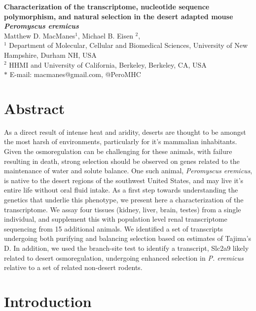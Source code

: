 \documentclass[11pt]{article}
\date{}
\newcommand{\peer}{\textit{P. eremicus}}
\begin{document}
\begin{flushleft}
{\Large
\textbf{Characterization of the transcriptome, nucleotide sequence polymorphism, and natural selection in the desert adapted mouse \textit{Peromyscus eremicus}}
}
\\
Matthew D. MacManes$^{1}$, 
Michael B. Eisen $^{2}$, 
\\
$^{1}$ Department of Molecular, Cellular and Biomedical Sciences, University of New Hampshire, Durham NH, USA
\\
$^{2}$ HHMI and University of California, Berkeley, Berkeley, CA, USA
\\
$\ast$ E-mail: macmanes@gmail.com, @PeroMHC
\end{flushleft}

\linenumbers

\section*{Abstract}

As a direct result of intense heat and aridity, deserts are thought to be amongst the most harsh of environments, particularly for it's mammalian inhabitants. Given the osmoregulation can be challenging for these animals, with failure resulting in death, strong selection should be observed on genes related to the maintenance of water and solute balance. One such animal, \textit{Peromyscus eremicus}, is native to the desert regions of the southwest United States, and may live it's entire life without oral fluid intake. As a first step towards understanding the genetics that underlie this phenotype, we present here a characterization of the transcriptome. We assay four tissues (kidney, liver, brain, testes) from a single individual, and supplement this with population level renal transcriptome sequencing from 15 additional animals. We identified a set of transcripts undergoing both purifying and balancing selection based on estimates of Tajima's D. In addition, we used the branch-site test to identify a transcript, Slc2a9 likely related to desert osmoregulation, undergoing enhanced selection in \peer\: relative to a set of related non-desert rodents.  \\


\section*{Introduction}
\end{document}
